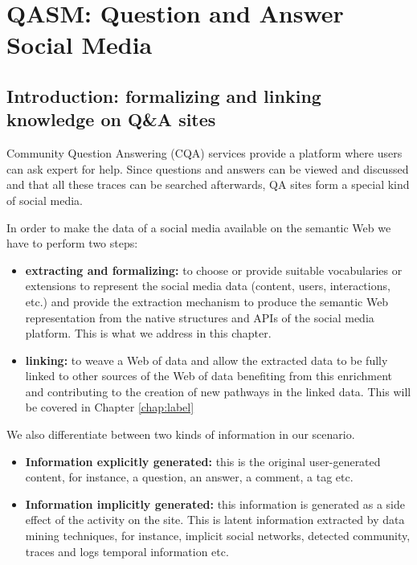 \chapter{QASM: Question and Answer Social Media}
\doublespacing
\label{chap:qasm}
\minitoc

\section{Introduction: formalizing and linking knowledge on Q\&A sites}
Community Question Answering (CQA) services provide a platform where users can ask expert for help. Since questions and answers can be viewed and discussed and that all these traces can be searched afterwards, QA sites form a special kind of social media.


In order to make the data of a social media available on the semantic Web we have to perform two steps:

\begin{itemize}
\item \textbf{extracting and formalizing:} to choose or provide suitable vocabularies or extensions to represent the social media data (content, users, interactions, etc.) and provide the extraction mechanism to produce the semantic Web representation from the native structures and APIs of the social media platform. This is what we address in this chapter.
\item \textbf{linking:} to weave a Web of data and allow the extracted data to be fully linked to other sources of the Web of data benefiting from this enrichment and contributing to the creation of new pathways in the linked data. This will be covered in Chapter \ref{chap:label}
\end{itemize}

We also differentiate between two kinds of information in our scenario.
\begin{itemize}
\item \textbf{Information explicitly generated:} this is the original user-generated content, for instance, a question, an answer, a comment, a tag etc.
\item \textbf{Information implicitly generated:}  this information is generated as a side effect of the activity on the site. This is latent information extracted by data mining techniques, for instance, implicit social networks, detected community, traces and logs temporal information etc.
\end{itemize}



